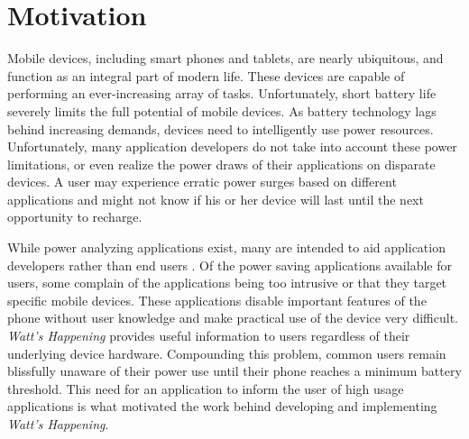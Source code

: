 \section{Motivation}
\label{sec:motivation}
Mobile devices, including smart phones and tablets, are nearly ubiquitous, and function as an integral part of modern life. 
These devices are capable of performing an ever-increasing array of tasks. 
Unfortunately, short battery life severely limits the full potential of mobile devices. 
As battery technology lags behind increasing demands, devices need to intelligently use power resources. 
Unfortunately, many application developers do not take into account these power limitations, or even realize the power draws of their applications on disparate devices. 
A user may experience erratic power surges based on different applications and might not know if his or her device will last until the next opportunity to recharge. 

While power analyzing applications exist, many are intended to aid application developers rather than end users \cite{Pathak:2012:ESI:2168836.2168841} \cite{energy-aware}. 
Of the power saving applications available for users, some complain of the applications being too intrusive or that they target specific mobile devices. 
These applications disable important features of the phone without user knowledge and make practical use of the device very difficult.
\emph{Watt's Happening} provides useful information to users regardless of their underlying device hardware.
Compounding this problem, common users remain blissfully unaware of their power use until their phone reaches a minimum battery threshold.
This need for an application to inform the user of high usage applications is what motivated the work behind developing and implementing \emph{Watt's Happening}.

